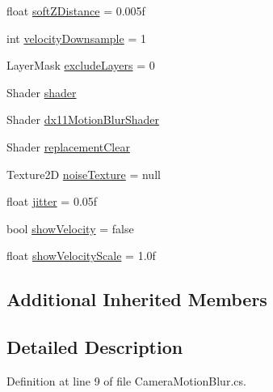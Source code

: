 \begin{DoxyCompactItemize}
\item 
float \mbox{\hyperlink{class_unity_standard_assets_1_1_image_effects_1_1_camera_motion_blur_aa886fe88ff2a12dddbc9c4df69ab7404}{soft\+Z\+Distance}} = 0.\+005f
\item 
int \mbox{\hyperlink{class_unity_standard_assets_1_1_image_effects_1_1_camera_motion_blur_a875795278909fce61ce927b811d9bfc9}{velocity\+Downsample}} = 1
\item 
Layer\+Mask \mbox{\hyperlink{class_unity_standard_assets_1_1_image_effects_1_1_camera_motion_blur_a14ae08ddd250d890ab9d8111664a98cb}{exclude\+Layers}} = 0
\item 
Shader \mbox{\hyperlink{class_unity_standard_assets_1_1_image_effects_1_1_camera_motion_blur_ab70160db6d191d6699c2ab42237fcb28}{shader}}
\item 
Shader \mbox{\hyperlink{class_unity_standard_assets_1_1_image_effects_1_1_camera_motion_blur_a82277d1aa23f22c3040addcbda6b88c6}{dx11\+Motion\+Blur\+Shader}}
\item 
Shader \mbox{\hyperlink{class_unity_standard_assets_1_1_image_effects_1_1_camera_motion_blur_a61ea61914365c6cc376703c7622522af}{replacement\+Clear}}
\item 
Texture2D \mbox{\hyperlink{class_unity_standard_assets_1_1_image_effects_1_1_camera_motion_blur_a955966e7fef27a44c4b9321dd5940606}{noise\+Texture}} = null
\item 
float \mbox{\hyperlink{class_unity_standard_assets_1_1_image_effects_1_1_camera_motion_blur_a05ab2d0c4ecd827f05a6fccb9dc572bb}{jitter}} = 0.\+05f
\item 
bool \mbox{\hyperlink{class_unity_standard_assets_1_1_image_effects_1_1_camera_motion_blur_a3d537fe58f5088b59edbeafae8b7ec32}{show\+Velocity}} = false
\item 
float \mbox{\hyperlink{class_unity_standard_assets_1_1_image_effects_1_1_camera_motion_blur_a2c3ab3b871c9f4cd8ed9206dcdd56b86}{show\+Velocity\+Scale}} = 1.\+0f
\end{DoxyCompactItemize}
\subsection*{Additional Inherited Members}


\subsection{Detailed Description}


Definition at line 9 of file Camera\+Motion\+Blur.\+cs.



